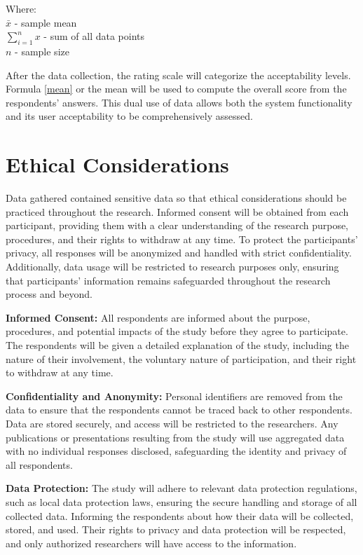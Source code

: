 	Where:
	\\$\bar{x}$ - sample mean
	\\$\sum_{i=1}^{n} x$ - sum of all data points
	\\$n$ - sample size
	
	
	After the data collection, the rating scale will categorize the acceptability levels. Formula \ref{mean} or the mean will be used to compute the overall score from the respondents' answers. This dual use of data allows both the system functionality and its user acceptability to be comprehensively assessed. 

\section{Ethical Considerations}
	Data gathered contained sensitive data so that ethical considerations should be practiced throughout the research.  Informed consent will be obtained from each participant, providing them with a clear understanding of the research purpose, procedures, and their rights to withdraw at any time. To protect the participants’ privacy, all responses will be anonymized and handled with strict confidentiality. Additionally, data usage will be restricted to research purposes only, ensuring that participants' information remains safeguarded throughout the research process and beyond. 
	
	\textbf{Informed Consent:} All respondents are informed about the purpose, procedures, and potential impacts of the study before they agree to participate. The respondents will be given a detailed explanation of the study, including the nature of their involvement, the voluntary nature of participation, and their right to withdraw at any time.
	
	\textbf{Confidentiality and Anonymity:} Personal identifiers are removed from the data to ensure that the respondents cannot be traced back to other respondents. Data are stored securely, and access will be restricted to the researchers. Any publications or presentations resulting from the study will use aggregated data with no individual responses disclosed, safeguarding the identity and privacy of all respondents.
	
	\textbf{Data Protection:} The study will adhere to relevant data protection regulations, such as local data protection laws, ensuring the secure handling and storage of all collected data. Informing the respondents about how their data will be collected, stored, and used. Their rights to privacy and data protection will be respected, and only authorized researchers will have access to the information.
	
